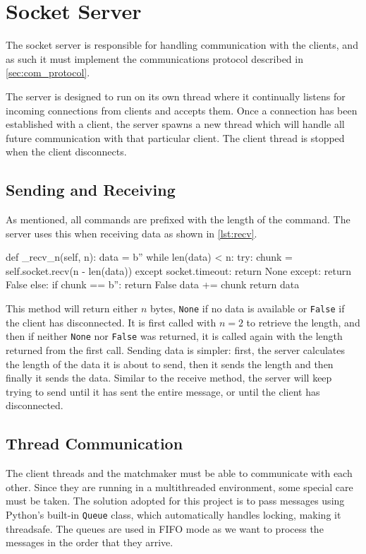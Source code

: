 \section{Socket Server}
The socket server is responsible for handling communication with the clients, and as such it must implement the communications protocol described in \autoref{sec:com_protocol}.

The server is designed to run on its own thread where it continually listens for incoming connections from clients and accepts them.
Once a connection has been established with a client, the server spawns a new thread which will handle all future communication with that particular client.
The client thread is stopped when the client disconnects.

\subsection{Sending and Receiving}
As mentioned, all commands are prefixed with the length of the command.
The server uses this when receiving data as shown in \autoref{lst:recv}.

\begin{code}[language={Python}, caption={Method for Receiving $n$ Bytes}, label={lst:recv}]
def _recv_n(self, n):
	data = b''
	while len(data) < n:
		try:
			chunk = self.socket.recv(n - len(data))
		except socket.timeout:
			return None
		except:
			return False
		else:
			if chunk == b'':
				return False
			data += chunk
	return data
\end{code}

This method will return either $n$ bytes, \texttt{None} if no data is available or \texttt{False} if the client has disconnected.
It is first called with $n=2$ to retrieve the length, and then if neither \texttt{None} nor \texttt{False} was returned, it is called again with the length returned from the first call.
Sending data is simpler: first, the server calculates the length of the data it is about to send, then it sends the length and then finally it sends the data.
Similar to the receive method, the server will keep trying to send until it has sent the entire message, or until the client has disconnected.

\subsection{Thread Communication}
The client threads and the matchmaker must be able to communicate with each other.
Since they are running in a multithreaded environment, some special care must be taken.
The solution adopted for this project is to pass messages using Python's built-in \texttt{Queue} class, which automatically handles locking, making it threadsafe.
The queues are used in \ac{FIFO} mode as we want to process the messages in the order that they arrive.


